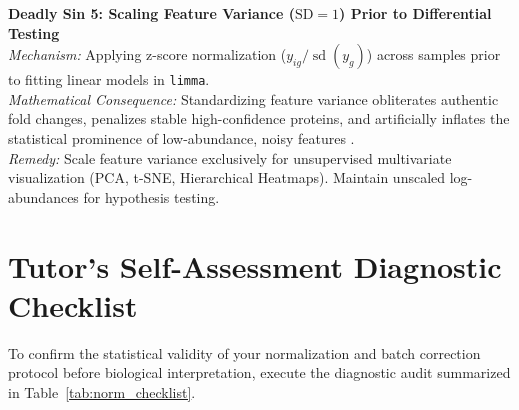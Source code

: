 \documentclass[11pt,oneside]{book}
\begin{document}
\begin{pitfallbox}
\textbf{Deadly Sin 5: Scaling Feature Variance ($\text{SD}=1$) Prior to Differential Testing}\\
\textit{Mechanism:} Applying z-score normalization ($y_{ig} / \operatorname{sd}(y_g)$) across samples prior to fitting linear models in \texttt{limma}.\\
\textit{Mathematical Consequence:} Standardizing feature variance obliterates authentic fold changes, penalizes stable high-confidence proteins, and artificially inflates the statistical prominence of low-abundance, noisy features \cite{smyth2004linear, ritchie2015limma}.\\
\textit{Remedy:} Scale feature variance exclusively for unsupervised multivariate visualization (PCA, t-SNE, Hierarchical Heatmaps). Maintain unscaled log-abundances for hypothesis testing.
\end{pitfallbox}

\section{Tutor's Self-Assessment Diagnostic Checklist}

To confirm the statistical validity of your normalization and batch correction protocol before biological interpretation, execute the diagnostic audit summarized in Table~\ref{tab:norm_checklist}.
\end{document}
